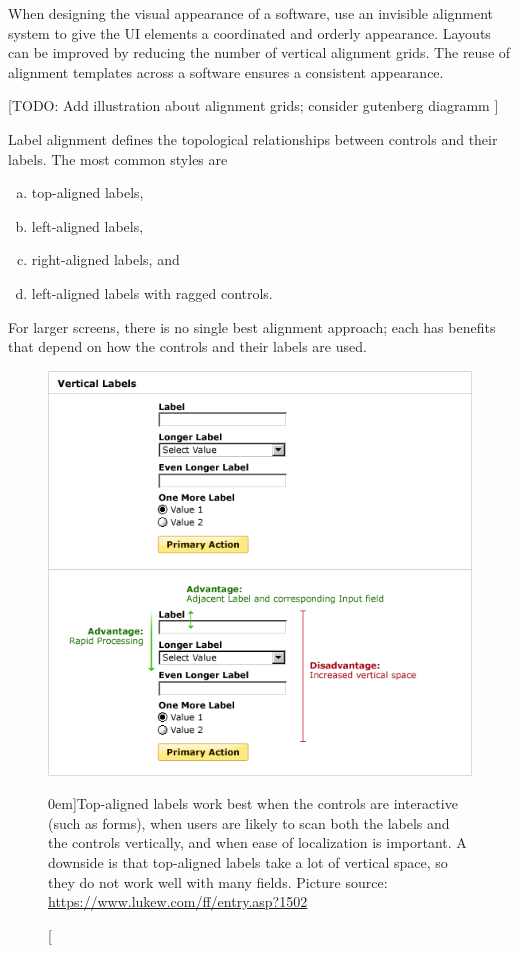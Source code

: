 
When designing the visual appearance of a software, use an invisible alignment system to give the UI elements a coordinated and orderly appearance. 
Layouts can be improved by reducing the number of vertical alignment grids. 
The reuse of alignment templates across a software ensures a consistent appearance.

[TODO: Add illustration about alignment grids; consider gutenberg diagramm ]

Label alignment defines the topological relationships between controls and their labels. The most common styles are 
\begin{enumerate}[(a)]
	\item top-aligned labels,
	\item left-aligned labels,
	\item right-aligned labels, and
	\item left-aligned labels with ragged controls.
\end{enumerate}
For larger screens, there is no single best alignment approach; each has benefits that depend on how the controls and their labels are used. 


\begin{figure}%
  \includegraphics[width=\textwidth]{../figures/vertical_align.png}
  \caption[][0em]{Top-aligned labels work best when the controls are interactive (such as forms), when users are likely to scan both the labels and the controls vertically, and when ease of localization is important. A downside is that top-aligned labels take a lot of vertical space, so they do not work well with many fields. \newline Picture source: \url{https://www.lukew.com/ff/entry.asp?1502}}
  \label{fig:vertical_align}
\end{figure}

